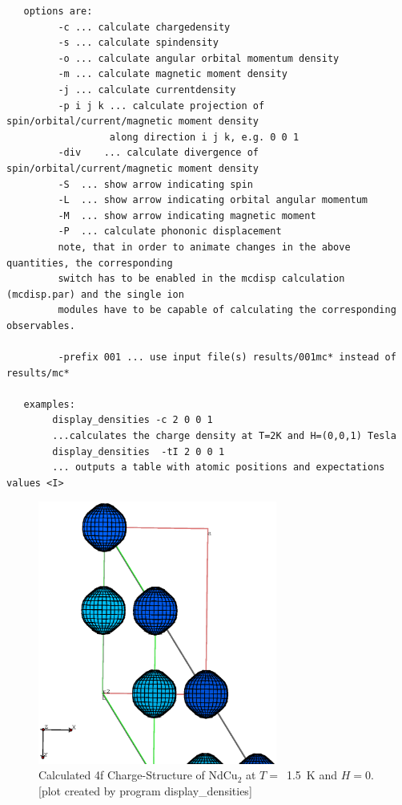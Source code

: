 \begin{verbatim}
   options are:
         -c ... calculate chargedensity
         -s ... calculate spindensity
         -o ... calculate angular orbital momentum density
         -m ... calculate magnetic moment density
         -j ... calculate currentdensity
         -p i j k ... calculate projection of spin/orbital/current/magnetic moment density
                  along direction i j k, e.g. 0 0 1
         -div    ... calculate divergence of spin/orbital/current/magnetic moment density
         -S  ... show arrow indicating spin
         -L  ... show arrow indicating orbital angular momentum
         -M  ... show arrow indicating magnetic moment
         -P  ... calculate phononic displacement
         note, that in order to animate changes in the above quantities, the corresponding
         switch has to be enabled in the mcdisp calculation (mcdisp.par) and the single ion
         modules have to be capable of calculating the corresponding observables.
 
         -prefix 001 ... use input file(s) results/001mc* instead of results/mc*
 
   examples:
        display_densities -c 2 0 0 1
        ...calculates the charge density at T=2K and H=(0,0,1) Tesla
        display_densities  -tI 2 0 0 1 
        ... outputs a table with atomic positions and expectations values <I> 
\end{verbatim}

\begin{figure}[hb]%
\begin{center}\leavevmode
\includegraphics[angle=0, width=0.7\textwidth]{figsrc/ndcu2b/resultss/chargesab.eps}
\end{center}
\caption{Calculated 4f Charge-Structure of NdCu$_2$ at $T=$~1.5~K and $H=0$.
[plot created by program {\prg display\_densities}]}
\label{chargegraphic}
\end{figure}

